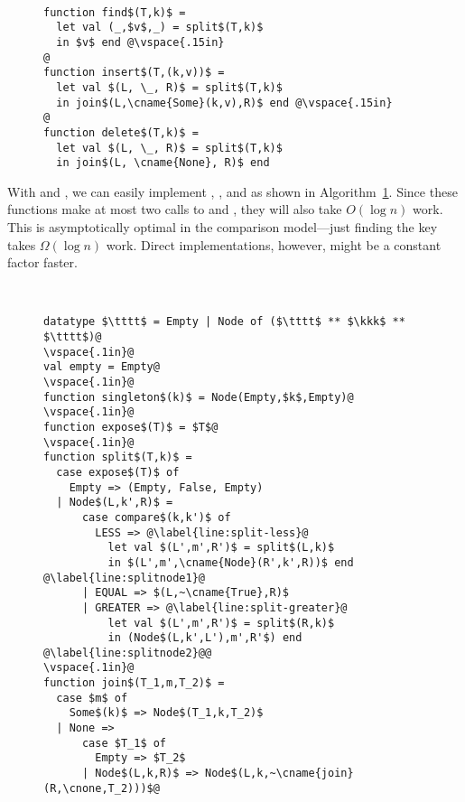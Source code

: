 \begin{figure}
\begin{algorithm}~
\label{alg:searchInsertDelete}
\begin{lstlisting}[numbers=none]
function find$(T,k)$ =
  let val (_,$v$,_) = split$(T,k)$
  in $v$ end @\vspace{.15in}
@
function insert$(T,(k,v))$ =
  let val $(L, \_, R)$ = split$(T,k)$
  in join$(L,\cname{Some}(k,v),R)$ end @\vspace{.15in}
@
function delete$(T,k)$ =
  let val $(L, \_, R)$ = split$(T,k)$
  in join$(L, \cname{None}, R)$ end
\end{lstlisting}
\end{algorithm}
\end{figure}

With  and , we can easily implement
, , and  as shown in
Algorithm~\ref{alg:searchInsertDelete}.  Since these functions make at
most two calls to  and , they will also take
$O(\log n)$ work.  This is asymptotically optimal in the comparison
model---just finding the key takes $\Omega(\log n)$ work.  
Direct implementations, however, might be a constant factor faster.


\begin{figure}
\begin{datastructure}~
\label{ds:bstjoin}
\begin{lstlisting}
datatype $\tttt$ = Empty | Node of ($\tttt$ ** $\kkk$ ** $\tttt$)@
\vspace{.1in}@
val empty = Empty@
\vspace{.1in}@
function singleton$(k)$ = Node(Empty,$k$,Empty)@
\vspace{.1in}@
function expose$(T)$ = $T$@
\vspace{.1in}@
function split$(T,k)$ =
  case expose$(T)$ of
    Empty => (Empty, False, Empty)
  | Node$(L,k',R)$ =
      case compare$(k,k')$ of
        LESS => @\label{line:split-less}@
          let val $(L',m',R')$ = split$(L,k)$
          in $(L',m',\cname{Node}(R',k',R))$ end @\label{line:splitnode1}@
      | EQUAL => $(L,~\cname{True},R)$
      | GREATER => @\label{line:split-greater}@
          let val $(L',m',R')$ = split$(R,k)$
          in (Node$(L,k',L'),m',R'$) end @\label{line:splitnode2}@@
\vspace{.1in}@
function join$(T_1,m,T_2)$ =
  case $m$ of
    Some$(k)$ => Node$(T_1,k,T_2)$
  | None =>
      case $T_1$ of
        Empty => $T_2$
      | Node$(L,k,R)$ => Node$(L,k,~\cname{join}(R,\cnone,T_2)))$@
\end{lstlisting}
\end{datastructure}
\end{figure}

